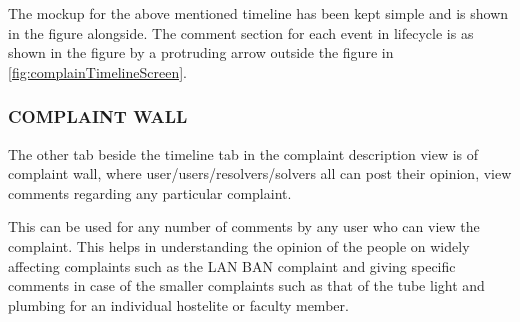 \documentclass[12pt]{article}
\begin{document}
 \par   The mockup for the above mentioned timeline has been kept simple and is shown in the figure alongside. The comment section for each event in lifecycle is as shown in the figure by a protruding arrow outside the figure in \ref{fig:complainTimelineScreen}. 
 
 
      \subsubsection{COMPLAINT WALL}
      
\par The other tab beside the timeline tab in the complaint description view is of complaint wall, where user/users/resolvers/solvers all can post their opinion, view comments regarding any particular complaint.
 \par This can be used for any number of comments by any user who can view the complaint. This helps in understanding the opinion of the people on widely affecting complaints such as the LAN BAN complaint and giving specific comments in case of the smaller complaints such as that of the tube light and plumbing for an individual hostelite or faculty member.
  
  
  
\end{document}
